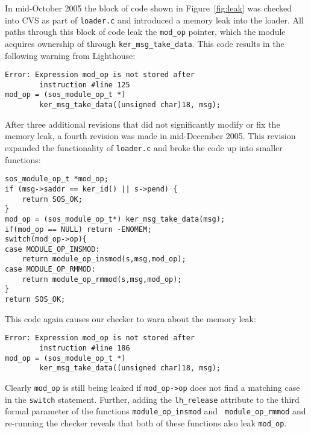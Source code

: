 In mid-October 2005 the block of code shown in Figure~\ref{fig:leak} was
checked into CVS as part of {\tt loader.c} and introduced a memory leak into
the loader.  
%
All paths through this block of code leak the {\tt mod\_op} pointer, which
the module acquires ownership of through {\tt ker\_msg\_take\_data}.  
%
This code results in the following warning from Lighthouse:



\begin{scriptsize}
\begin{verbatim}
Error: Expression mod_op is not stored after 
        instruction #line 125
mod_op = (sos_module_op_t *)
        ker_msg_take_data((unsigned char)18, msg);
\end{verbatim}
\end{scriptsize}



After three additional revisions that did not significantly modify or fix
the memory leak, a fourth revision was made in mid-December 2005.
%
This revision expanded the functionality of {\tt loader.c} and broke the
code up into smaller functions:



\begin{scriptsize}
\begin{verbatim}
sos_module_op_t *mod_op;
if (msg->saddr == ker_id() || s->pend) {
    return SOS_OK;
}
mod_op = (sos_module_op_t*) ker_msg_take_data(msg);
if(mod_op == NULL) return -ENOMEM;
switch(mod_op->op){
case MODULE_OP_INSMOD:
    return module_op_insmod(s,msg,mod_op);
case MODULE_OP_RMMOD:
    return module_op_rmmod(s,msg,mod_op);
}
return SOS_OK;
\end{verbatim}
\end{scriptsize}



This code again causes our checker to warn about the memory leak:



\begin{scriptsize}
\begin{verbatim}
Error: Expression mod_op is not stored after 
        instruction #line 186
mod_op = (sos_module_op_t *)
        ker_msg_take_data((unsigned char)18, msg);
\end{verbatim}
\end{scriptsize}



Clearly {\tt mod\_op} is still being leaked if {\tt mod\_op->op} does not
find a matching case in the {\tt switch} statement.  
%
Further, adding the {\tt lh\_release} attribute to the third formal
parameter of the functions {\tt module\_op\_insmod} and {\tt
module\_op\_rmmod} and re-running the checker reveals that both of these
functions also leak {\tt mod\_op}.




